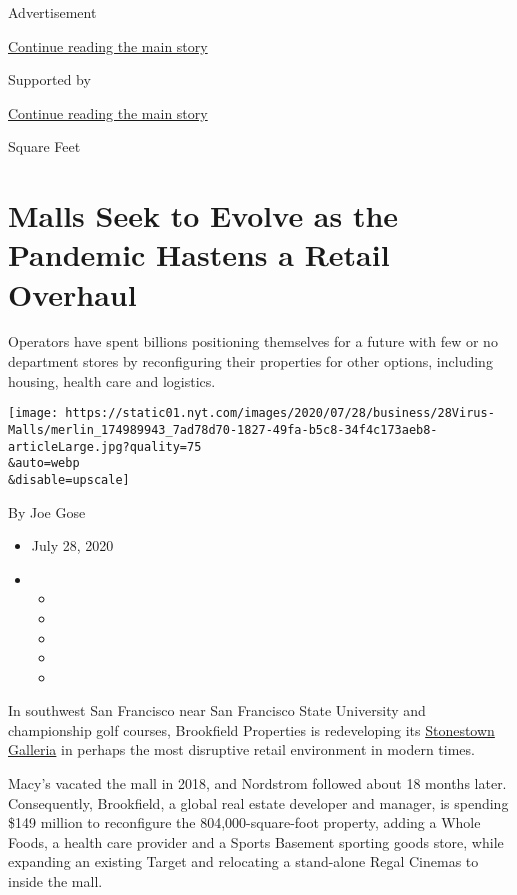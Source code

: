 Advertisement

\protect\hyperlink{after-top}{Continue reading the main story}

Supported by

\protect\hyperlink{after-sponsor}{Continue reading the main story}

Square Feet

\hypertarget{malls-seek-to-evolve-as-the-pandemic-hastens-a-retail-overhaul}{%
\section{Malls Seek to Evolve as the Pandemic Hastens a Retail
Overhaul}\label{malls-seek-to-evolve-as-the-pandemic-hastens-a-retail-overhaul}}

Operators have spent billions positioning themselves for a future with
few or no department stores by reconfiguring their properties for other
options, including housing, health care and logistics.

\texttt{[image: https://static01.nyt.com/images/2020/07/28/business/28Virus-Malls/merlin\_174989943\_7ad78d70-1827-49fa-b5c8-34f4c173aeb8-articleLarge.jpg?quality=75\\\&auto=webp\\\&disable=upscale]}

By Joe Gose

\begin{itemize}
\item
  July 28, 2020
\item
  \begin{itemize}
  \item
  \item
  \item
  \item
  \item
  \end{itemize}
\end{itemize}

In southwest San Francisco near San Francisco State University and
championship golf courses, Brookfield Properties is redeveloping its
\href{https://www.stonestowngalleria.com/en.html}{Stonestown Galleria}
in perhaps the most disruptive retail environment in modern times.

Macy's vacated the mall in 2018, and Nordstrom followed about 18 months
later. Consequently, Brookfield, a global real estate developer and
manager, is spending \$149 million to reconfigure the
804,000-square-foot property, adding a Whole Foods, a health care
provider and a Sports Basement sporting goods store, while expanding an
existing Target and relocating a stand-alone Regal Cinemas to inside the
mall.

